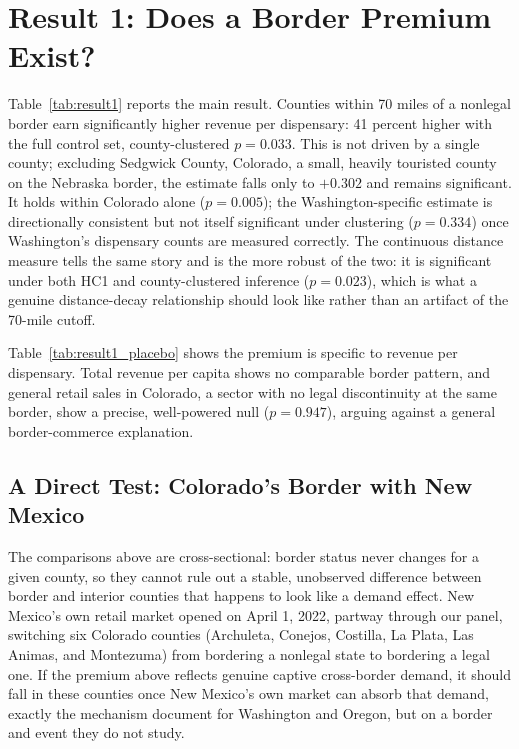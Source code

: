 \documentclass[12pt]{article}
\begin{document}
\section{Result 1: Does a Border Premium Exist?}
\label{sec:result1}



Table~\ref{tab:result1} reports the main result. Counties within 70 miles of a nonlegal border earn
significantly higher revenue per dispensary: 41 percent higher with the full control set, county-clustered
$p=0.033$. This is not driven by a single county; excluding Sedgwick County, Colorado, a small, heavily
touristed county on the Nebraska border, the estimate falls only to $+0.302$ and remains significant. It
holds within Colorado alone ($p=0.005$); the Washington-specific estimate is directionally consistent but
not itself significant under clustering ($p=0.334$) once Washington's dispensary counts are measured
correctly. The continuous distance measure tells the same story and is the more robust of the two: it is
significant under both HC1 and county-clustered inference ($p=0.023$), which is what a genuine
distance-decay relationship should look like rather than an artifact of the 70-mile cutoff.



Table~\ref{tab:result1_placebo} shows the premium is specific to revenue per dispensary. Total revenue per
capita shows no comparable border pattern, and general retail sales in Colorado, a sector with no legal
discontinuity at the same border, show a precise, well-powered null ($p=0.947$), arguing against a general
border-commerce explanation.

\subsection{A Direct Test: Colorado's Border with New Mexico}
\label{sec:co_nm}

The comparisons above are cross-sectional: border status never changes for a given county, so they cannot
rule out a stable, unobserved difference between border and interior counties that happens to look like a
demand effect. New Mexico's own retail market opened on April 1, 2022, partway through our panel, switching
six Colorado counties (Archuleta, Conejos, Costilla, La Plata, Las Animas, and Montezuma) from bordering a
nonlegal state to bordering a legal one. If the premium above reflects genuine captive cross-border demand,
it should fall in these counties once New Mexico's own market can absorb that demand, exactly the mechanism
\citet{HansenMillerWeber2020} document for Washington and Oregon, but on a border and event they do not
study.
\end{document}
